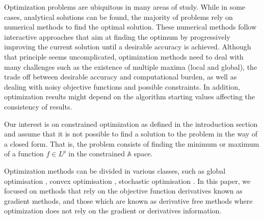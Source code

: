 Optimization problems are ubiquitous in many areas of study. While in
some cases, analytical solutions can be found, the majority of problems
rely on numerical methods to find the optimal solution. These numerical
methods follow interactive approaches that aim at finding the optimum by
progressively improving the current solution until a desirable accuracy
is achieved. Although that principle seems uncomplicated, optimization
methods need to deal with many challenges such as the existence of
multiple maxima (local and global), the trade off between desirable
accuracy and computational burden, as well as dealing with noisy
objective functions and possible constraints. In addition, optimization
results might depend on the algorithm starting values affecting the
consistency of results.

Our interest is on constrained optimization
\citep{bertsekas2014constrained} as defined in the introduction section
and assume that it is not possible to find a solution to the problem in
the way of a closed form. That is, the problem consists of finding the
minimum or maximum of a function \(f \in L^p\) in the constrained
\(\mathbb{A}\) space.

Optimization methods can be divided in various classes, such as global
optimisation \citep{kelley1999iterative, fletcher2013practical}, convex
optimisation \citep{boyd2004convex}, stochastic optimisation
\citep{nocedal2006numerical} . In this paper, we focused on methods that
rely on the objective function derivatives known as gradient methods,
and those which are known as derivative free methods where optimization
does not rely on the gradient or derivatives information.

